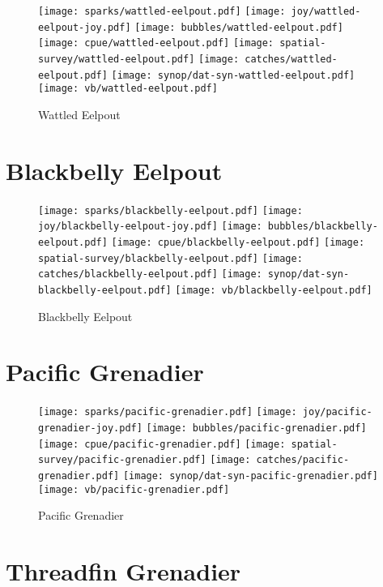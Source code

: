 \begin{figure}[htbp]
\centering
\texttt{[image: sparks/wattled-eelpout.pdf]}
\texttt{[image: joy/wattled-eelpout-joy.pdf]}
\texttt{[image: bubbles/wattled-eelpout.pdf]}
\texttt{[image: cpue/wattled-eelpout.pdf]}
\texttt{[image: spatial-survey/wattled-eelpout.pdf]}
\texttt{[image: catches/wattled-eelpout.pdf]}
\texttt{[image: synop/dat-syn-wattled-eelpout.pdf]}
\texttt{[image: vb/wattled-eelpout.pdf]}
\caption{Wattled Eelpout}
\end{figure}
\clearpage
\section{Blackbelly Eelpout}

\begin{figure}[htbp]
\centering
\texttt{[image: sparks/blackbelly-eelpout.pdf]}
\texttt{[image: joy/blackbelly-eelpout-joy.pdf]}
\texttt{[image: bubbles/blackbelly-eelpout.pdf]}
\texttt{[image: cpue/blackbelly-eelpout.pdf]}
\texttt{[image: spatial-survey/blackbelly-eelpout.pdf]}
\texttt{[image: catches/blackbelly-eelpout.pdf]}
\texttt{[image: synop/dat-syn-blackbelly-eelpout.pdf]}
\texttt{[image: vb/blackbelly-eelpout.pdf]}
\caption{Blackbelly Eelpout}
\end{figure}
\clearpage
\section{Pacific Grenadier}

\begin{figure}[htbp]
\centering
\texttt{[image: sparks/pacific-grenadier.pdf]}
\texttt{[image: joy/pacific-grenadier-joy.pdf]}
\texttt{[image: bubbles/pacific-grenadier.pdf]}
\texttt{[image: cpue/pacific-grenadier.pdf]}
\texttt{[image: spatial-survey/pacific-grenadier.pdf]}
\texttt{[image: catches/pacific-grenadier.pdf]}
\texttt{[image: synop/dat-syn-pacific-grenadier.pdf]}
\texttt{[image: vb/pacific-grenadier.pdf]}
\caption{Pacific Grenadier}
\end{figure}
\clearpage
\section{Threadfin Grenadier}

